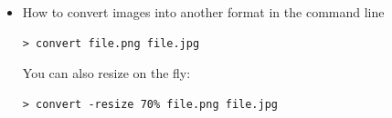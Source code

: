 \begin{itemize}
\item How to convert images into another format in the command line

\begin{verbatim}
> convert file.png file.jpg
\end{verbatim}

You can also resize on the fly:

\begin{verbatim}
> convert -resize 70% file.png file.jpg
\end{verbatim}



\end{itemize}

